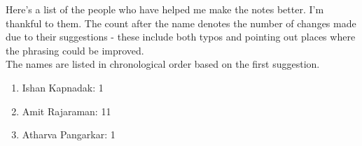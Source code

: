 Here's a list of the people who have helped me make the notes better. I'm thankful to them. The count after the name denotes the number of changes made due to their suggestions - these include both typos and pointing out places where the phrasing could be improved.\\
The names are listed in chronological order based on the first suggestion.\\

\begin{enumerate}[nosep]
	\item Ishan Kapnadak: 1
	\item Amit Rajaraman: 11
	\item Atharva Pangarkar: 1
\end{enumerate}